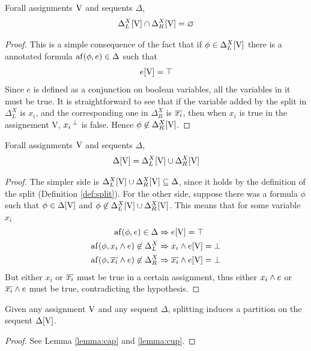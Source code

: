 \documentclass[a4paper, 12pt, english]{report}
\begin{document}
\begin{lemma}
	\label{lemma:cap}
	Forall assignments $\mathrm{V}$ and sequents $\Delta$,
	$$ \Delta_L^X[\mathrm{V}] \cap \Delta_R^X[\mathrm{V}] = \varnothing $$
\end{lemma}
\begin{proof}
	This is a simple consequence of the fact that if $\phi \in \Delta_L^X[\mathrm{V}]$ there is a annotated formula $\mathrm{af}(\phi, e) \in \Delta$ such that 
	$$ e[\mathrm{V}] = \top $$
	Since $e$ is defined as a conjunction on boolean variables, all the variables in it must be true.
	It is straightforward to see that if the variable added by the split in $\Delta_L^X$ is $x_i$, and the corresponding one in $\Delta_R^X$ is $\overline{x_i}$, then when $x_i$ is true in the assignement V, ${x_i}\,^{\bot}$ is false.
	Hence $\phi \not \in \Delta_R^X[\mathrm{V}]$.
\end{proof}
\begin{lemma}
	\label{lemma:cup}
	Forall assignments $\mathrm{V}$ and sequents $\Delta$,
	$$ \Delta[\mathrm{V}] = \Delta_L^X[\mathrm{V}] \cup \Delta_R^X[\mathrm{V}] $$
\end{lemma}
\begin{proof}
	The simpler side is $\Delta_L^X[\mathrm{V}] \cup \Delta_R^X[\mathrm{V}] \subseteq \Delta$, since it  holds by the definition of the split (Definition \ref{def:split}).
	For the other side, suppose there was a formula $\phi$ such that $\phi \in \Delta[\mathrm{V}]$ and $\phi \not \in \Delta_L^X[\mathrm{V}] \cup \Delta_R^X[\mathrm{V}]$.
	This means that for some variable $x_i$ 
	\begin{align*}
		\mathrm{af}(\phi, e) \in \Delta &\Rightarrow e[\mathrm{V}] = \top \\
		\mathrm{af}(\phi, x_i \wedge e) \not \in \Delta_L^X &\Rightarrow x_i \wedge e[\mathrm{V}] = \bot \\
		\mathrm{af}(\phi, \overline{x_i} \wedge e) \not \in \Delta_R^X &\Rightarrow \overline{x_i} \wedge e[\mathrm{V}] = \bot
	\end{align*}
	But either $x_i$ or $\overline{x_i}$ must be true in a certain assignment, thus either $x_i \wedge e$ or $\overline{x_i} \wedge e$ must be true, contradicting the hypothesis.
\end{proof}
\begin{lemma}
	Given any assignment $\mathrm{V}$ and any sequent $\Delta$, splitting induces a partition on the sequent $\Delta[\mathrm{V}]$.
\end{lemma}
\begin{proof}
	See Lemma \ref{lemma:cap} and \ref{lemma:cup}.
\end{proof}
\end{document}
